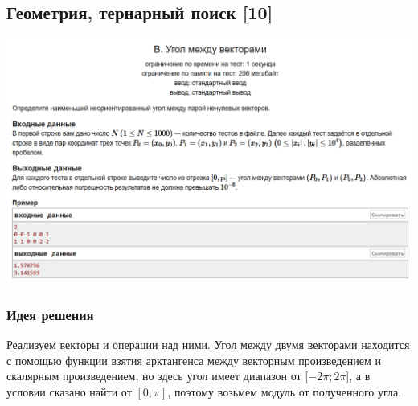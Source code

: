 \subsection*{Геометрия, тернарный поиск [10]}
\begin{center}
\includegraphics[width=\textwidth]{12B.png}
\end{center}
\subsubsection*{Идея решения}
Реализуем векторы и операции над ними. Угол между двумя векторами находится с помощью функции взятия арктангенса между векторным произведением и скалярным произведением, но здесь угол имеет диапазон от [$-2\pi; 2\pi$], а в условии сказано найти от $[0; \pi]$, поэтому возьмем модуль от полученного угла. 
